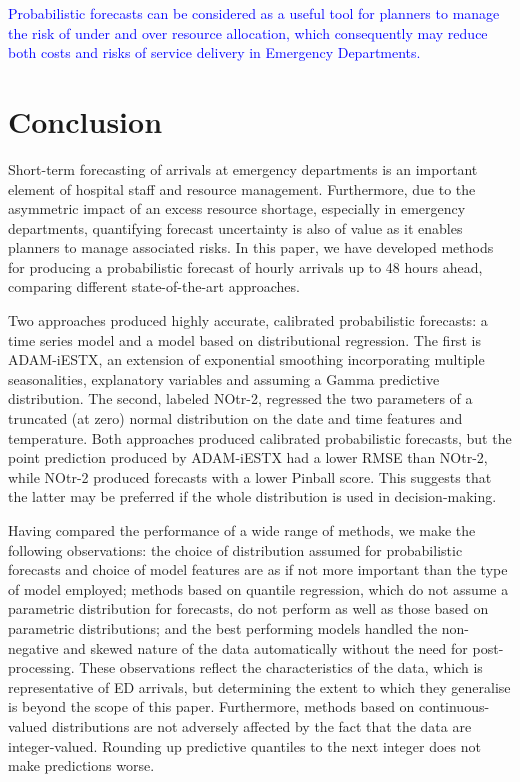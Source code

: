 \documentclass[]{elsarticle} %
\begin{document}
\textcolor{blue}{Probabilistic forecasts can be considered as a useful tool for planners to manage the risk of under and over resource allocation, which consequently may reduce both costs and risks of service delivery in Emergency Departments.}

\hypertarget{conclusion}{%
\section{Conclusion}\label{conclusion}}

Short-term forecasting of arrivals at emergency departments is an
important element of hospital staff and resource management.
Furthermore, due to the asymmetric impact of an excess resource
shortage, especially in emergency departments, quantifying forecast
uncertainty is also of value as it enables planners to manage associated
risks. In this paper, we have developed methods for producing a
probabilistic forecast of hourly arrivals up to 48 hours ahead,
comparing different state-of-the-art approaches.

Two approaches produced highly accurate, calibrated probabilistic
forecasts: a time series model and a model based on distributional
regression. The first is ADAM-iESTX, an extension of exponential
smoothing incorporating multiple seasonalities, explanatory variables
and assuming a Gamma predictive distribution. The second, labeled
NOtr-2, regressed the two parameters of a truncated (at zero) normal
distribution on the date and time features and temperature. Both
approaches produced calibrated probabilistic forecasts, but the point
prediction produced by ADAM-iESTX had a lower RMSE than NOtr-2, while
NOtr-2 produced forecasts with a lower Pinball score. This suggests that
the latter may be preferred if the whole distribution is used in
decision-making.

Having compared the performance of a wide range of methods, we make the
following observations: the choice of distribution assumed for
probabilistic forecasts and choice of model features are as if not more
important than the type of model employed; methods based on quantile
regression, which do not assume a parametric distribution for forecasts,
do not perform as well as those based on parametric distributions; and
the best performing models handled the non-negative and skewed nature of
the data automatically without the need for post-processing. These
observations reflect the characteristics of the data, which is
representative of ED arrivals, but determining the extent to which they
generalise is beyond the scope of this paper. Furthermore, methods based
on continuous-valued distributions are not adversely affected by the
fact that the data are integer-valued. Rounding up predictive quantiles
to the next integer does not make predictions worse.
\end{document}
